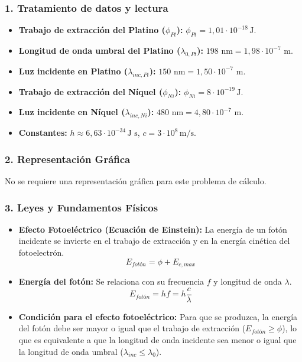 \subsubsection*{1. Tratamiento de datos y lectura}
\begin{itemize}
    \item \textbf{Trabajo de extracción del Platino ($\phi_{Pt}$):} $\phi_{Pt} = 1,01 \cdot 10^{-18} \, \text{J}$.
    \item \textbf{Longitud de onda umbral del Platino ($\lambda_{0,Pt}$):} $198 \text{ nm} = 1,98 \cdot 10^{-7} \text{ m}$.
    \item \textbf{Luz incidente en Platino ($\lambda_{inc,Pt}$):} $150 \text{ nm} = 1,50 \cdot 10^{-7} \text{ m}$.
    \item \textbf{Trabajo de extracción del Níquel ($\phi_{Ni}$):} $\phi_{Ni} = 8 \cdot 10^{-19} \, \text{J}$.
    \item \textbf{Luz incidente en Níquel ($\lambda_{inc,Ni}$):} $480 \text{ nm} = 4,80 \cdot 10^{-7} \text{ m}$.
    \item \textbf{Constantes:} $h \approx 6,63\cdot10^{-34}\,\text{J s}$, $c = 3\cdot10^8\,\text{m/s}$.
\end{itemize}

\subsubsection*{2. Representación Gráfica}
No se requiere una representación gráfica para este problema de cálculo.

\subsubsection*{3. Leyes y Fundamentos Físicos}
\begin{itemize}
    \item \textbf{Efecto Fotoeléctrico (Ecuación de Einstein):} La energía de un fotón incidente se invierte en el trabajo de extracción y en la energía cinética del fotoelectrón.
    $$E_{fotón} = \phi + E_{c,max}$$
    \item \textbf{Energía del fotón:} Se relaciona con su frecuencia $f$ y longitud de onda $\lambda$.
    $$E_{fotón} = hf = h\frac{c}{\lambda}$$
    \item \textbf{Condición para el efecto fotoeléctrico:} Para que se produzca, la energía del fotón debe ser mayor o igual que el trabajo de extracción ($E_{fotón} \ge \phi$), lo que es equivalente a que la longitud de onda incidente sea menor o igual que la longitud de onda umbral ($\lambda_{inc} \le \lambda_0$).
\end{itemize}

